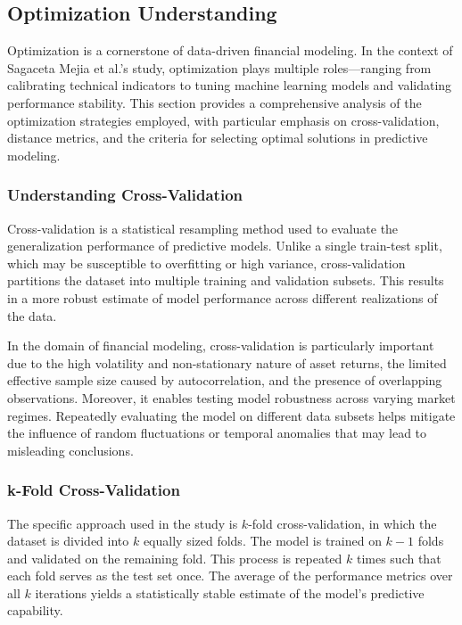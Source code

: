 \subsection{Optimization Understanding}

Optimization is a cornerstone of data-driven financial modeling. In the context of Sagaceta Mejia et al.'s study, optimization plays multiple roles—ranging from calibrating technical indicators to tuning machine learning models and validating performance stability. This section provides a comprehensive analysis of the optimization strategies employed, with particular emphasis on cross-validation, distance metrics, and the criteria for selecting optimal solutions in predictive modeling.

\subsubsection{Understanding Cross-Validation}

Cross-validation is a statistical resampling method used to evaluate the generalization performance of predictive models. Unlike a single train-test split, which may be susceptible to overfitting or high variance, cross-validation partitions the dataset into multiple training and validation subsets. This results in a more robust estimate of model performance across different realizations of the data.

In the domain of financial modeling, cross-validation is particularly important due to the high volatility and non-stationary nature of asset returns, the limited effective sample size caused by autocorrelation, and the presence of overlapping observations. Moreover, it enables testing model robustness across varying market regimes. Repeatedly evaluating the model on different data subsets helps mitigate the influence of random fluctuations or temporal anomalies that may lead to misleading conclusions.

\subsubsection{k-Fold Cross-Validation}

The specific approach used in the study is $k$-fold cross-validation, in which the dataset is divided into $k$ equally sized folds. The model is trained on $k-1$ folds and validated on the remaining fold. This process is repeated $k$ times such that each fold serves as the test set once. The average of the performance metrics over all $k$ iterations yields a statistically stable estimate of the model’s predictive capability.

